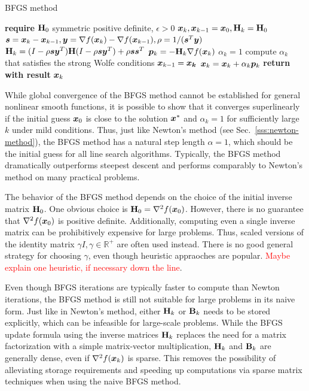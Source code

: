 \begin{algorithm}
\caption{BFGS method}\label{alg:bfgs}
\begin{algorithmic}
\State \textbf{require } $\mathbf{H}_0$ symmetric positive definite, $\epsilon > 0$
\State $\bm{x}_k, \bm{x}_{k-1} = \bm{x}_0, \mathbf{H}_k = \mathbf{H}_0 $
\State $\bm{s} = \bm{x}_k - \bm{x}_{k-1}, \bm{y} = \nabla f(\bm{x}_k) - \nabla f(\bm{x}_{k-1}), \rho = 1 / (\bm{s}^T \bm{y})$
\State $\mathbf{H}_k = (I - \rho \bm{s} \bm{y}^T) \mathbf{H}(I - \rho \bm{s} \bm{y}^T) + \rho\bm{s}\bm{s}^T$
\State $\bm{p}_k = -\mathbf{H}_k \nabla f(\bm{x}_k)$
\State $\alpha_k = 1$
\State compute $\alpha_k$ that satisfies the strong Wolfe conditions
\EndIf
\State $\bm{x}_{k-1} = \bm{x_k}$
\State $\bm{x}_k = \bm{x}_k + \alpha_k \bm{p}_k$
\EndWhile
\State \textbf{return with result } $\bm{x}_k$
\EndProcedure
\end{algorithmic}
\end{algorithm}

While global convergence of the BFGS method cannot be established for general nonlinear smooth functions, it is possible to show that it converges 
superlinearly if the initial guess $\bm{x}_0$ is close to the solution $\bm{x}^*$ and $\alpha_k = 1$ for sufficiently large $k$ 
under mild conditions. Thus, just like Newton's method (see Sec.\ \ref{sss:newton-method}), the BFGS method has a natural step length $\alpha=1$,
which should be the initial guess for all line search algorithms. Typically, the BFGS method dramatically outperforms steepest 
descent and performs comparably to Newton's method on many practical problems. 

The behavior of the BFGS method depends on the choice of the initial inverse matrix $\mathbf{H}_0$. One obvious choice is $\mathbf{H}_0 = \nabla^2 
f(\bm{x}_0)$. However, there is no guarantee that $\nabla^2 f(\bm{x}_0)$ is positive definite. Additionally, computing even a single inverse
matrix can be prohibitively expensive for large problems. Thus, scaled versions of the identity matrix $\gamma I, \gamma \in \mathbb{R}^+$ are
often used instead. There is no good general strategy for choosing $\gamma$, even though heuristic appraoches are popular. \textcolor{red}{Maybe
explain one heuristic, if necessary down the line}.

Even though BFGS iterations are typically faster to compute than Newton iterations, the BFGS method is still not suitable for large problems 
in its naive form. Just like in Newton's method, either $\mathbf{H}_k$ or $\mathbf{B}_k$ needs to be stored explicitly, which can be infeasible for 
large-scale problems. While the BFGS update formula using the inverse matrices $\mathbf{H}_k$ replaces the need for a matrix factorization with a simple 
matrix-vector multiplication, $\mathbf{H}_k$ and $\mathbf{B}_k$ are generally dense, even if $\nabla^2 f(\bm{x}_k)$ is sparse. This removes the possibility
of alleviating storage requirements and speeding up computations via sparse matrix techniques when using the naive BFGS method.

